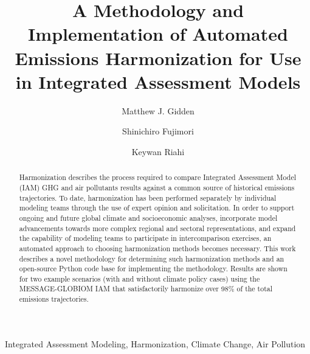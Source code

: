 \begin{frontmatter}

\title{A Methodology and Implementation of Automated Emissions Harmonization for Use in Integrated Assessment Models}

\author[iiasa]{Matthew J. Gidden}

\author[iiasa,nies]{Shinichiro Fujimori}
\author[iiasa]{Keywan Riahi}

\address[iiasa]{International Institute for Applied Systems Analysis,
  Schlossplatz 1, A-2361 Laxenburg, Austria}
\address[nies]{National Institute for Environmental Studies, Tsukuba, Japan}

\begin{abstract}
Harmonization describes the process required to compare Integrated Assessment
Model (IAM) GHG and air pollutants results against a common source of historical
emissions trajectories. To date, harmonization has been performed separately by
individual modeling teams through
% 
% 
% 
the use of expert opinion and solicitation. In order to support ongoing and
future global climate and socioeconomic analyses, incorporate model advancements
towards more complex regional and sectoral representations, and expand the
capability of modeling teams to participate in intercomparison exercises, an
automated approach to choosing harmonization methods becomes necessary. This
work describes a novel
% 
% 
methodology for determining such harmonization methods and an open-source Python
code base for implementing the methodology. Results are shown for two example
scenarios (with and without climate policy cases) using the MESSAGE-GLOBIOM IAM that satisfactorily harmonize over 98\%
of the total emissions trajectories.
\end{abstract}

\begin{keyword}
Integrated Assessment Modeling, Harmonization, Climate Change, Air Pollution 
\end{keyword}

\end{frontmatter}

\linenumbers
